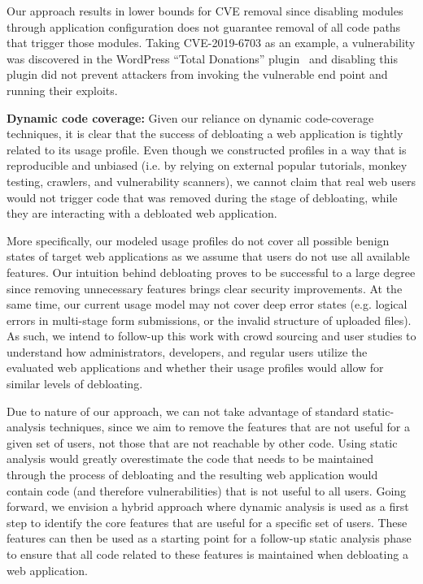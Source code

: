 Our approach results in lower bounds for CVE removal since disabling modules through application configuration does not guarantee removal of all code paths that trigger those modules. Taking CVE-2019-6703 as an example, a vulnerability was discovered in the WordPress ``Total Donations'' plugin~\cite{wordpressPlugin} and disabling this plugin did not prevent attackers from invoking the vulnerable end point and running their exploits.

\vspace{1ex}
\noindent\textbf{Dynamic code coverage:}  Given our reliance on dynamic
code-coverage techniques, it is clear that the success of debloating a web application
is tightly related to its usage profile. Even though we constructed profiles
in a way that is reproducible and unbiased (i.e. by relying on external
popular tutorials, monkey testing, crawlers, and vulnerability scanners), we cannot claim that
real web users would not trigger code that was removed during the stage of
debloating, while they are interacting with a debloated web application.

More specifically, our modeled usage profiles do not cover all possible benign states of target web applications as we assume that users do not use all available features.
Our intuition behind debloating proves to be successful to a large degree since removing unnecessary features brings clear security improvements.
At the same time, our current usage model may not cover deep error states (e.g. logical errors in multi-stage form submissions, or the invalid structure of uploaded files).
As such, we intend to follow-up this work with crowd sourcing and user studies
to understand how administrators, developers, and regular users utilize the
evaluated web applications and whether their usage profiles would allow for
similar levels of debloating.

Due to nature of our approach, we can not take advantage of standard
static-analysis techniques, since we aim to remove the features that are
not useful for a given set of users, not those that are not reachable by
other code. Using static analysis would greatly overestimate the code that
needs to be maintained through the process of debloating and the resulting
web application would contain code (and therefore vulnerabilities) that is
not useful to all users. Going forward, we envision a hybrid approach where
dynamic analysis is used as a first step to identify the core features that
are useful for a specific set of users. These features can then be used as
a starting point for a follow-up static analysis phase to ensure that all
code related to these features is maintained when debloating a web application.

